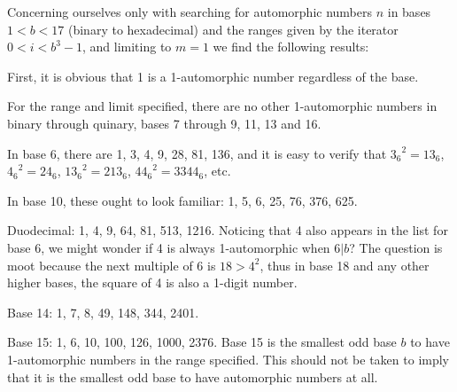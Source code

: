 \documentclass[12pt]{article}
\begin{document}
Concerning ourselves only with searching for automorphic numbers $n$ in bases $1 < b < 17$ (binary to hexadecimal) and the ranges given by the iterator $0 < i < b^3 - 1$, and limiting to $m = 1$ we find the following results:

First, it is obvious that 1 is a 1-automorphic number regardless of the base.

For the range and limit specified, there are no other 1-automorphic numbers in binary through quinary, bases 7 through 9, 11, 13 and 16.

In base 6, there are 1, 3, 4, 9, 28, 81, 136, and it is easy to verify that ${3_6}^2 = 13_6$, ${4_6}^2 = 24_6$, ${13_6}^2 = 213_6$, ${44_6}^2 = 3344_6$, etc.

In base 10, these ought to look familiar: 1, 5, 6, 25, 76, 376, 625.

Duodecimal: 1, 4, 9, 64, 81, 513, 1216. Noticing that 4 also appears in the list for base 6, we might wonder if 4 is always 1-automorphic when $6|b$? The question is moot because the next multiple of 6 is $18 > 4^2$, thus in base 18 and any other higher bases, the square of 4 is also a 1-digit number.

Base 14: 1, 7, 8, 49, 148, 344, 2401.

Base 15: 1, 6, 10, 100, 126, 1000, 2376. Base 15 is the smallest odd base $b$ to have 1-automorphic numbers in the range specified. This should not be taken to imply that it is the smallest odd base to have automorphic numbers at all.
\end{document}
